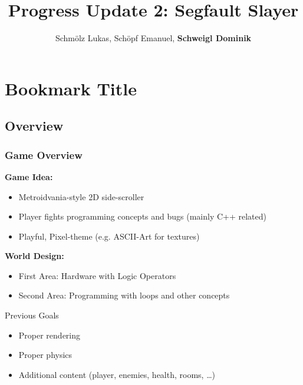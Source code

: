 \documentclass[11pt,t,usepdftitle=false,aspectratio=169]{beamer}
\title[Segfault Slayer]{Progress Update 2: Segfault Slayer}
\author[Schmölz Lukas, Schöpf Emanuel, Schweigl Dominik]{Schmölz Lukas, Schöpf Emanuel, \textbf{Schweigl Dominik}}
\begin{document}
\section{Bookmark Title}
\subsection{Overview}

\begin{frame}
	\frametitle{Game Overview}

	\textbf{Game Idea:}
	\begin{itemize}
		\item Metroidvania-style 2D side-scroller
		\item Player fights programming concepts and bugs (mainly C++ related)
		\item Playful, Pixel-theme (e.g. ASCII-Art for textures)
	\end{itemize}

	\bigskip

	\textbf{World Design:}
	\begin{itemize}
		\item First Area: Hardware with Logic Operators
		\item Second Area: Programming with loops and other concepts
	\end{itemize}
\end{frame}

\begin{frame}{Previous Goals}
	\vspace{1em}
	\begin{itemize}
		\item Proper rendering
		\item Proper physics
		\item Additional content (player, enemies, health, rooms, \ldots)
	\end{itemize}
\end{frame}
\end{document}
